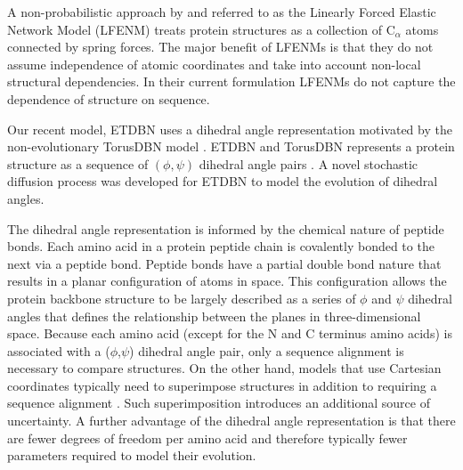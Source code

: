 \documentclass[nogrid]{MBE}%
\begin{document}

A non-probabilistic approach by \citet{echave2008evolutionary} and \citet{echave2010perturbative} referred to as the Linearly Forced Elastic Network Model (LFENM)  treats protein structures as a collection of $\text{C}_{\alpha}$ atoms connected by spring forces. The major benefit of LFENMs is that they do not assume independence of atomic coordinates and take into account non-local structural dependencies. In their current formulation LFENMs do not capture the dependence of structure on sequence.

Our recent model, ETDBN \citep{Golden2017} uses a dihedral angle representation motivated by the non-evolutionary TorusDBN model \citep{boomsma2008generative, boomsma2014equilibrium}. ETDBN and TorusDBN represents a protein structure as a sequence of $(\phi,\psi)$ dihedral angle pairs \citep{frellsen2012towards}. A novel stochastic diffusion process  \citet{garciap2016diffusions} was developed for ETDBN to model the evolution of dihedral angles.

The dihedral angle representation is informed by the chemical nature of peptide bonds. Each amino acid in a protein peptide chain is covalently bonded to the next via a peptide bond. Peptide bonds have a partial double bond nature that results in a planar configuration of atoms in space. This configuration allows the protein backbone structure to be largely described as a series of $\phi$ and $\psi$ dihedral angles that defines the relationship between the planes in three-dimensional space. Because each amino acid (except for the N and C terminus amino acids) is associated with a ($\phi$,$\psi$) dihedral angle pair, only a sequence alignment is necessary to compare structures. On the other hand, models that use Cartesian coordinates typically need to superimpose structures in addition to requiring a sequence alignment \citep{herman2014simultaneous}. Such superimposition introduces an additional source of uncertainty. A further advantage of the dihedral angle representation is that there are fewer degrees of freedom per amino acid and therefore typically fewer parameters required to model their evolution.
\end{document}
